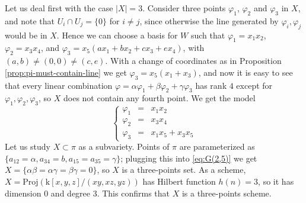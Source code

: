 \documentclass[10pt,reqno]{amsart}
\newcommand{\GG}{\mathbb{G}}
\renewcommand{\a}{\alpha}
\renewcommand{\b}{\beta}
\newcommand{\g}{\gamma}
\newcommand{\f}{\varphi}
\newcommand{\kk}{\mathrm{k}}
\newtheorem{proposition}[theorem]{Proposition}
\theoremstyle{definition}
\begin{document}


\noindent Let us deal first with the case $|X|=3$. Consider three points $\f_1$, $\f_2$ and $\f_3$ in $X$, and note that $U_i \cap U_j=\{0\}$ for $i \ne j$, since otherwise the line generated by $\f_i, \f_j$ would be in $X$. Hence we can choose a basis for $W$ such that $\f_1=x_1x_2$, $\f_2=x_3x_4$, and $\f_3=x_5 (ax_1 + bx_2 + cx_3 + ex_4)$, with $(a,b) \ne (0,0) \ne (c,e)$. With a change of coordinates as in Proposition \ref{prop:pi-must-contain-line} we get $\f_3=x_5(x_1+x_3)$, and now it is easy to see that every linear combination $\f=\a \f_1 + \b \f_2+ \g \f_3$ has rank $4$ except for $\f_1, \f_2, \f_3$, so $X$ does not contain any fourth point. We get the model
\[ 
\left\{\begin{array}{ccl}
 \f_1 & = & x_1x_2\\
 \f_2 & = & x_3x_4\\
 \f_3 & = & x_1x_5+x_3x_5
\end{array}\right.
\]
Let us study $X \subset \pi$ as a subvariety. Points of $\pi$ are parameterized as $\{a_{12}=\a,a_{34}=b,a_{15}=a_{35}=\gamma\}$; plugging this into \eqref{eq:G(2,5)} we get 
$X=\{
\a \b=\a \g=\b \g=0\}$, so $X$ is a three-points set. As a scheme, $X=\mathrm{Proj}(\kk[x,y,z]/(xy,xz,yz))$ has Hilbert function $h(n)=3$, so it has dimension $0$ and degree 3. This confirms that $X$ is a three-points scheme. 
\end{document}
